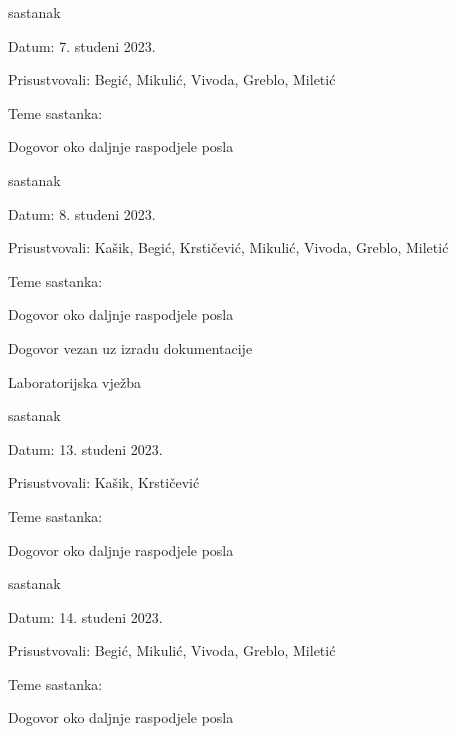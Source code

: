 \begin{packed_enum}
            \item  sastanak
			\item[] \begin{packed_item}
				\item Datum: 7. studeni 2023.
				\item Prisustvovali: Begić, Mikulić, Vivoda, Greblo, Miletić
				\item Teme sastanka:
				\begin{packed_item}
					\item  Dogovor oko daljnje raspodjele posla
				\end{packed_item}
			\end{packed_item}

            \item  sastanak
			\item[] \begin{packed_item}
				\item Datum: 8. studeni 2023.
				\item Prisustvovali: Kašik, Begić, Krstičević, Mikulić, Vivoda, Greblo, Miletić
				\item Teme sastanka:
				\begin{packed_item}
					\item  Dogovor oko daljnje raspodjele posla
                    \item  Dogovor vezan uz izradu dokumentacije
                    \item  Laboratorijska vježba
				\end{packed_item}
			\end{packed_item}

            \item  sastanak
			\item[] \begin{packed_item}
				\item Datum: 13. studeni 2023.
				\item Prisustvovali: Kašik, Krstičević
				\item Teme sastanka:
				\begin{packed_item}
					\item  Dogovor oko daljnje raspodjele posla
				\end{packed_item}
			\end{packed_item}

            \item  sastanak
			\item[] \begin{packed_item}
				\item Datum: 14. studeni 2023.
				\item Prisustvovali: Begić, Mikulić, Vivoda, Greblo, Miletić
				\item Teme sastanka:
				\begin{packed_item}
					\item  Dogovor oko daljnje raspodjele posla
				\end{packed_item}
			\end{packed_item}


\end{packed_enum}
